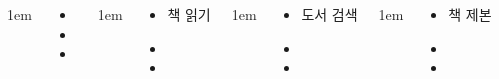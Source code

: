 \documentclass[	20pt, 
							a0paper, 
							landscape,
							margin=0mm, %
							innermargin=10mm,  		%
							blockverticalspace=4mm, %
							colspace=5mm, 
							subcolspace=0mm
							]{tikzposter}
\begin{document}
\begin{columns}
			{
					\setlength{\leftmargini}{4em}
					\setlength{\labelsep} {1em}
				\begin{LARGE}
					\begin{itemize}
					\item 
					\item 
					\item 
					\end{itemize}
				\end{LARGE}
			} %






			{
					\setlength{\leftmargini}{4em}
					\setlength{\labelsep} {1em}
				\begin{LARGE}
					\begin{itemize}
					\item 책 읽기
					\item 
					\item 
					\end{itemize}
				\end{LARGE}
			} %






			{
					\setlength{\leftmargini}{4em}
					\setlength{\labelsep} {1em}
				\begin{LARGE}
					\begin{itemize}
					\item 도서 검색
					\item 
					\item 
					\end{itemize}
				\end{LARGE}
			} %


			{
					\setlength{\leftmargini}{4em}
					\setlength{\labelsep} {1em}
				\begin{LARGE}
					\begin{itemize}
					\item 책 제본
					\item 
					\item 
					\end{itemize}
				\end{LARGE}
			} %







\end{columns}
\end{document}
